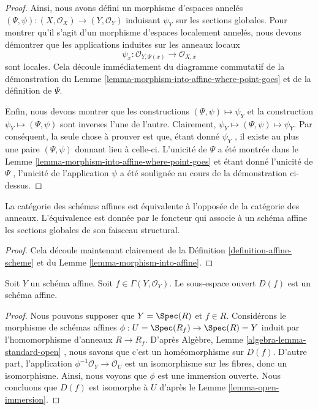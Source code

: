 \begin{proof}
\medskip\noindent
Ainsi, nous avons défini un morphisme d'espaces annelés  $(\Psi, \psi) : (X, \mathcal{O}_X) \to (Y, \mathcal{O}_Y)$  induisant
 $\psi_Y$  sur les sections globales. Pour montrer qu'il s'agit d'un morphisme
d'espaces localement annelés, nous devons démontrer que les applications induites
sur les anneaux locaux
$$
\psi_x : \mathcal{O}_{Y, \Psi(x)} \longrightarrow \mathcal{O}_{X, x}
$$
sont locales. Cela découle immédiatement du diagramme commutatif de la
démonstration du Lemme  \ref{lemma-morphism-into-affine-where-point-goes}  et de la définition de  $\Psi$.

\medskip\noindent
Enfin, nous devons montrer que les constructions  $(\Psi, \psi) \mapsto \psi_Y$  et la construction
 $\psi_Y \mapsto (\Psi, \psi)$  sont inverses l'une de l'autre. Clairement,  $\psi_Y \mapsto (\Psi, \psi) \mapsto \psi_Y$. Par
conséquent, la seule chose à prouver est que, étant donné  $\psi_Y$ , il existe
au plus une paire  $(\Psi, \psi)$  donnant lieu à celle-ci. L'unicité de  $\Psi$ 
a été montrée dans le Lemme  \ref{lemma-morphism-into-affine-where-point-goes}  et étant donné l'unicité de  $\Psi$ ,
l'unicité de l'application  $\psi$  a été soulignée au cours de la
démonstration ci-dessus.
\end{proof}

\begin{lemma}
\label{lemma-category-affine-schemes}
La catégorie des schémas affines est équivalente à l'opposée de la catégorie des
anneaux. L'équivalence est donnée par le foncteur qui associe à un schéma affine
les sections globales de son faisceau structural.
\end{lemma}

\begin{proof}
Cela découle maintenant clairement de la Définition  \ref{definition-affine-scheme}  et du Lemme
 \ref{lemma-morphism-into-affine}.
\end{proof}

\begin{lemma}
\label{lemma-standard-open-affine}
Soit  $Y$  un schéma affine. Soit  $f \in \Gamma(Y, \mathcal{O}_Y)$. Le sous-espace ouvert
 $D(f)$  est un schéma affine.
\end{lemma}

\begin{proof}
Nous pouvons supposer que  $Y = \Spec(R)$  et  $f \in R$. Considérons le morphisme
de schémas affines  $\phi : U = \Spec(R_f) \to \Spec(R) = Y$  induit par l'homomorphisme d'anneaux  $R \to R_f$.
D'après Algèbre, Lemme  \ref{algebra-lemma-standard-open} , nous savons que c'est un homéomorphisme
sur  $D(f)$. D'autre part, l'application  $\phi^{-1}\mathcal{O}_Y \to \mathcal{O}_U$  est un isomorphisme sur
les fibres, donc un isomorphisme. Ainsi, nous voyons que  $\phi$  est une
immersion ouverte. Nous concluons que  $D(f)$  est isomorphe à  $U$ 
d'après le Lemme  \ref{lemma-open-immersion}.
\end{proof}

